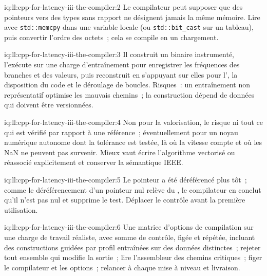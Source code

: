 \begin{solution}{iq:ll:cpp-for-latency-iii-the-compiler:2}
Le compilateur peut supposer que des pointeurs vers des types sans rapport ne désignent jamais la même mémoire. Lire avec \texttt{std::memcpy}
dans une variable locale (ou \texttt{std::bit\_cast} sur un tableau), puis convertir l'ordre des octets~; cela se compile en un chargement.
\end{solution}

\begin{solution}{iq:ll:cpp-for-latency-iii-the-compiler:3}
Il construit un binaire instrumenté, l'exécute sur une charge d'entraînement pour enregistrer les fréquences des branches et des valeurs, puis reconstruit
en s'appuyant sur elles pour l', la disposition du code et le déroulage de boucles. Risques~: un entraînement non représentatif optimise les mauvais chemins~; la
construction dépend de données qui doivent être versionnées.
\end{solution}

\begin{solution}{iq:ll:cpp-for-latency-iii-the-compiler:4}
Non pour la valorisation, le risque ni tout ce qui est vérifié par rapport à une référence~; éventuellement pour un noyau numérique autonome dont
la tolérance est testée, là où la vitesse compte et où les NaN ne peuvent pas survenir. Mieux vaut écrire l'algorithme vectorisé ou réassocié
explicitement et conserver la sémantique IEEE.
\end{solution}

\begin{solution}{iq:ll:cpp-for-latency-iii-the-compiler:5}
Le pointeur a été déréférencé plus tôt~; comme le déréférencement d'un pointeur nul relève du , le compilateur en conclut qu'il n'est pas nul et
supprime le test. Déplacer le contrôle avant la première utilisation.
\end{solution}

\begin{solution}{iq:ll:cpp-for-latency-iii-the-compiler:6}
Une matrice d'options de compilation sur une charge de travail réaliste, avec somme de contrôle, figée et répétée, incluant des constructions guidées par profil entraînées sur
des données distinctes~; rejeter tout ensemble qui modifie la sortie~; lire l'assembleur des chemins critiques~; figer le compilateur et les options~; relancer à chaque
mise à niveau et livraison.
\end{solution}
